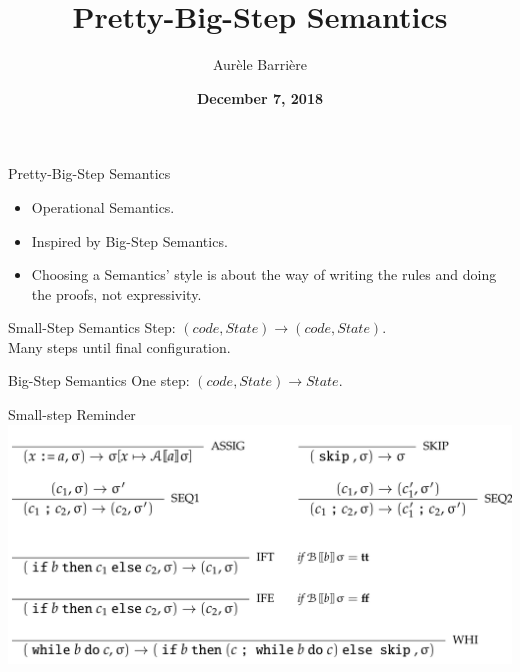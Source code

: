 \documentclass[page number,dvipsnames]{beamer}
\def\outline{
  \begin{frame}[plain,noframenumbering]
    \frametitle{Outline}
    \tableofcontents[currentsection]
  \end{frame}
}
\begin{document}
\title[Pretty Big Step]{Pretty-Big-Step Semantics}

\author[Aur\`ele Barri\`ere]{Aur\`ele Barri\`ere}

\date{\textbf{December 7, 2018}}

\def\outline{
  \begin{frame}[plain,noframenumbering]
    \frametitle{Outline}
    \tableofcontents[currentsection]
  \end{frame}
}

\begin{frame}
  \vspace{-2cm}
  \maketitle
  \vspace{-4cm}
\end{frame}



\begin{frame}{Pretty-Big-Step Semantics}
  \begin{itemize}
  \item Operational Semantics.
  \item Inspired by Big-Step Semantics.
  \item Choosing a Semantics' style is about the way of writing the rules and doing the proofs, not expressivity.
  \end{itemize}
  \vfill
  \begin{alertblock}{Small-Step Semantics}
    Step: $(\mathit{code},\mathit{State})\rightarrow(\mathit{code},\mathit{State})$.\\
    Many steps until final configuration.
  \end{alertblock}
  \vfill
  \begin{exampleblock}{Big-Step Semantics}
    One step: $(\mathit{code},\mathit{State})\rightarrow\mathit{State}$.
  \end{exampleblock}
  
\end{frame}

\begin{frame}{Small-step Reminder}
  \center
  \includegraphics[scale=0.2]{smallstep.png}
\end{frame}
\end{document}
